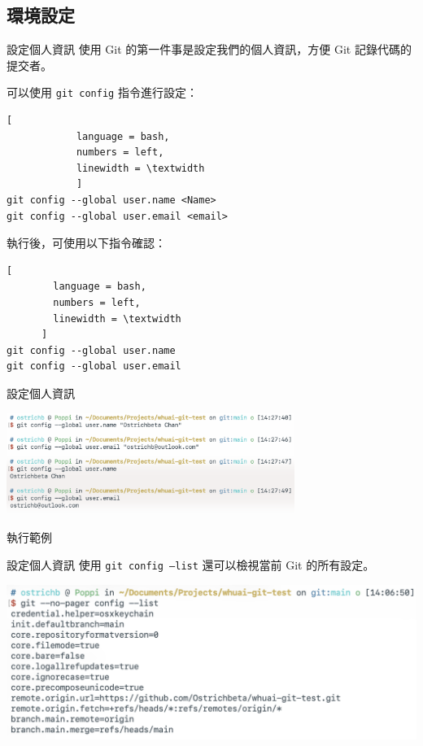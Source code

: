 \documentclass[xetex, unicode, 10pt, aspectratio=169]{beamer}
\begin{document}
\subsection{環境設定}

\begin{frame}[fragile]{設定個人資訊}
    使用 Git 的第一件事是設定我們的個人資訊，方便 Git 記錄代碼的提交者。

    可以使用 \texttt{git config} 指令進行設定：
    \begin{lstlisting}[
            language = bash,
            numbers = left,
            linewidth = \textwidth
            ]
git config --global user.name <Name>
git config --global user.email <email>\end{lstlisting}

    執行後，可使用以下指令確認：
    \begin{lstlisting}[
        language = bash,
        numbers = left,
        linewidth = \textwidth
      ]
git config --global user.name
git config --global user.email\end{lstlisting}
\end{frame}

\begin{frame}{設定個人資訊}
    \begin{center}
        \includegraphics[height=1.3in]{./img/set-name-email.png}

        執行範例
    \end{center}
\end{frame}

\begin{frame}{設定個人資訊}
    使用 \texttt{git config --list} 還可以檢視當前 Git 的所有設定。
    \begin{center}
        \includegraphics[height=2in]{./img/git-config-list.png}
    \end{center}
\end{frame}
\end{document}
